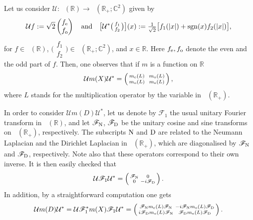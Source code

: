 \documentclass[11pt]{article}
\def\C{\mathbb C}
\def\F{\mathscr F}
\def\R{\mathbb R}
\def\U{\mathcal U}
\def\sgn{\mathop{\mathrm{sgn}}\nolimits}
\def\ltwo{\mathop{\mathrm{L}^2}\nolimits}
\begin{document}
Let us consider 
$\U:\ltwo(\R)\to\ltwo(\R_+;\C^2)$ given by
$$
\U f:=\sqrt2
\begin{pmatrix}
f_{\rm e}\\
f_{\rm o}
\end{pmatrix}\quad{\rm and}\quad
\big[\U^*
\big(\begin{smallmatrix}
f_1\\
f_2
\end{smallmatrix}\big)\big](x)
:=\textstyle\frac1{\sqrt2}
\big[f_1(|x|)+\sgn(x)f_2(|x|)\big],
$$
for $f\in\ltwo(\R)$, $\big(\begin{smallmatrix}
f_1\\
f_2
\end{smallmatrix}\big)\in\ltwo(\R_+;\C^2)$, and $x\in\R$.
Here $f_{\rm e}, f_{\rm o}$ denote the even and the odd part of $f$.
Then, one observes that if $m$ is a function on $\R$ 
\begin{equation*}
\U m(X)\U^*=
\left(\begin{smallmatrix}
m_{\rm e}(L)~ & m_{\rm o}(L)\\
m_{\rm o}(L)~ & m_{\rm e}(L)
\end{smallmatrix}\right),
\end{equation*}
where $L$ stands for the multiplication operator by the variable in $\ltwo(\R_+)$.

In order to consider $\U m(D)\U^*$, let us denote by $\F_1$ the usual unitary Fourier transform
in $\ltwo(\R)$, and let $\F_{\rm N}$, $\F_{\rm D}$ be the unitary cosine and sine transforms on $\ltwo(\R_+)$, respectively.  The subscripts $\rm N$ and $\rm D$ are related to the Neumann Laplacian and the Dirichlet Laplacian in $\ltwo(\R_+)$, which are diagonalised by $\F_{\rm N}$ and $\F_{\rm D}$, respectively.  
Note also that these operators correspond to their own inverse.
It is then easily checked that
$$
\U \F_1\U^*=
\left(\begin{smallmatrix}
\F_{\rm N} & 0\\
0 & -i\F_{\rm D}
\end{smallmatrix}\right).
$$
In addition, by a straightforward computation one gets
$$
\U m(D)\U^* = \U \F_1^* m(X) \F_1 \U^*
= 
\left(\begin{smallmatrix}
\F_{\rm N} m_{\rm e}(L)\F_{\rm N} &  -i \F_{\rm N} m_{\rm o}(L)\F_{\rm D}\\
i \F_{\rm D}m_{\rm o}(L)\F_{\rm N} & \F_{\rm D} m_{\rm e}(L) \F_{\rm D}
\end{smallmatrix}\right).
$$
\end{document}
